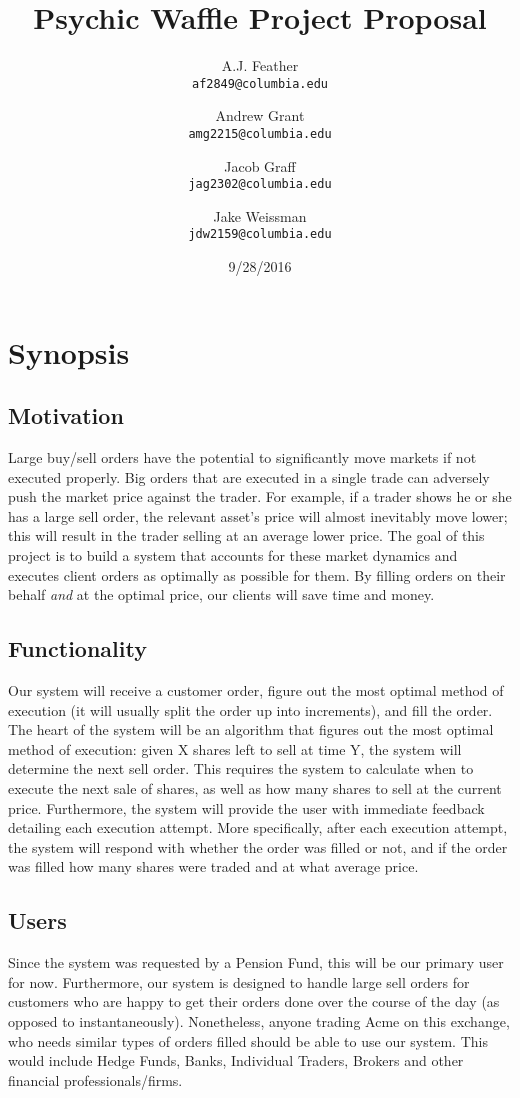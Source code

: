 \documentclass{article}
\title{Psychic Waffle Project Proposal}
\author{
    A.J. Feather\\
    \texttt{af2849@columbia.edu}
    \and
    Andrew Grant\\
    \texttt{amg2215@columbia.edu}
    \and
    Jacob Graff\\
    \texttt{jag2302@columbia.edu}
    \and
    Jake Weissman\\
    \texttt{jdw2159@columbia.edu}
}
\date{9/28/2016}
\begin{document}
\maketitle

\section{Synopsis}

\subsection{Motivation}
Large buy/sell orders have the potential to significantly move markets if not executed properly. Big orders that are executed in a single trade can adversely push the market price against the trader. For example, if a trader shows he or she has a large sell order, the relevant asset's price will almost inevitably move lower; this will result in the trader selling at an average lower price. The goal of this project is to build a system that accounts for these market dynamics and executes client orders as optimally as possible for them. By filling orders on their behalf \emph{and} at the optimal price, our clients will save time and money. 

\subsection{Functionality} %
Our system will receive a customer order, figure out the most optimal method of execution (it will usually split the order up into increments), and fill the order. The heart of the system will be an algorithm that figures out the most optimal method of execution: given X shares left to sell at time Y, the system will determine the next sell order. This requires the system to calculate when to execute the next sale of shares, as well as how many shares to sell at the current price. Furthermore, the system will provide the user with immediate feedback detailing each execution attempt. More specifically, after each execution attempt, the system will respond with whether the order was filled or not, and if the order was filled how many shares were traded and at what average price. 

\subsection{Users}
Since the system was requested by a Pension Fund, this will be our primary user for now. Furthermore, our system is designed to handle large sell orders for customers who are happy to get their orders done over the course of the day (as opposed to instantaneously). Nonetheless, anyone trading Acme on this exchange, who needs similar types of orders filled should be able to use our system. This would include Hedge Funds, Banks, Individual Traders, Brokers and other financial professionals/firms. 
\end{document}
